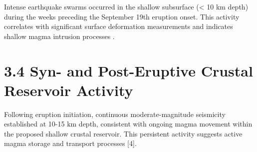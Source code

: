 \documentclass[
  spanish,
  letterpaper,
]{book}
\begin{document}
Intense earthquake swarms occurred in the shallow subsurface
(\textless{} 10 km depth) during the weeks preceding the September 19th
eruption onset. This activity correlates with significant surface
deformation measurements and indicates shallow magma intrusion processes
.

\section{3.4 Syn- and Post-Eruptive Crustal Reservoir
Activity}\label{syn--and-post-eruptive-crustal-reservoir-activity}

Following eruption initiation, continuous moderate-magnitude seismicity
established at 10-15 km depth, consistent with ongoing magma movement
within the proposed shallow crustal reservoir. This persistent activity
suggests active magma storage and transport processes {[}4{]}.
\end{document}
